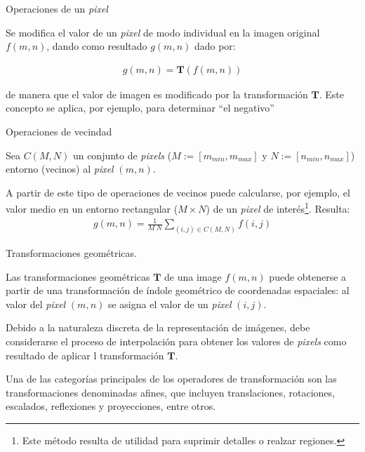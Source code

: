 \begin{center}
 Operaciones de un \textit{pixel}
\end{center}

Se modifica el valor de un \textit{pixel} de modo individual en la imagen original $f(m, n)$, dando como resultado $g(m, n)$ dado por:

\begin{eqnarray}
	g (m, n) = \mathbf{T} \left( f(m, n) \right)
\label{EqXLI}
\end{eqnarray}

de manera que el valor de imagen es modificado por la transformaci\'on $\mathbf{T}$. Este concepto se aplica, por ejemplo, para determinar ``el negativo''
\begin{center}
 Operaciones de vecindad
\end{center}

Sea $C (M, N)$ un conjunto de \textit{pixels} ($M := [m_{min}, m_{max}]$ y $N := [n_{min}, n_{max}]$) entorno (vecinos) al \textit{pixel} $(m, n)$.
%

%
A partir de este tipo de operaciones de vecinos puede calcularse, por ejemplo, el valor medio en un entorno rectangular ($M \times N$) de un \textit{pixel}
de inter\'es\footnote{Este m\'etodo resulta de utilidad para suprimir detalles o realzar regiones.}. Resulta:
%
\begin{eqnarray}
	g (m, n) = \frac{1}{ M \; N} \sum _{(i, j) \in C(M, N)} f(i, j)
\label{EqXLII}
\end{eqnarray}


\begin{center}
 Transformaciones geom\'etricas.
\end{center}

Las transformaciones geom\'etricas $\mathbf{T}$ de una image $f(m, n)$ puede obtenerse a partir de una transformaci\'on de \'indole geom\'etrico
de coordenadas espaciales: al valor del \textit{pixel} $(m, n)$ se asigna el valor de un \textit{pixel} $(i, j)$.
%

%
Debido a la naturaleza discreta de la representaci\'on de im\'agenes, debe considerarse el proceso de interpolaci\'on para obtener los valores de
\textit{pixels} como resultado de aplicar l transformaci\'on $\mathbf{T}$.
%

%
Una de las categor\'ias principales de los operadores de transformaci\'on son las transformaciones denominadas afines, que incluyen translaciones,
rotaciones, escalados, reflexiones y proyecciones, entre otros.
%

